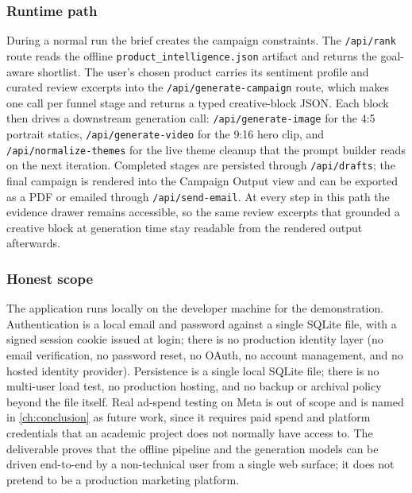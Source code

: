 \documentclass[12pt,a4paper]{report}
\begin{document}
\subsubsection{Runtime path}
\label{sec:webruntime}

During a normal run the brief creates the campaign constraints. The \texttt{/api/rank} route reads the offline \texttt{product\_intelligence.json} artifact and returns the goal-aware shortlist. The user's chosen product carries its sentiment profile and curated review excerpts into the \texttt{/api/generate-campaign} route, which makes one call per funnel stage and returns a typed creative-block JSON. Each block then drives a downstream generation call: \texttt{/api/generate-image} for the 4:5 portrait statics, \texttt{/api/generate-video} for the 9:16 hero clip, and \texttt{/api/normalize-themes} for the live theme cleanup that the prompt builder reads on the next iteration. Completed stages are persisted through \texttt{/api/drafts}; the final campaign is rendered into the Campaign Output view and can be exported as a PDF or emailed through \texttt{/api/send-email}. At every step in this path the evidence drawer remains accessible, so the same review excerpts that grounded a creative block at generation time stay readable from the rendered output afterwards.

\subsubsection{Honest scope}
\label{sec:webscope}

The application runs locally on the developer machine for the demonstration. Authentication is a local email and password against a single SQLite file, with a signed session cookie issued at login; there is no production identity layer (no email verification, no password reset, no OAuth, no account management, and no hosted identity provider). Persistence is a single local SQLite file; there is no multi-user load test, no production hosting, and no backup or archival policy beyond the file itself. Real ad-spend testing on Meta is out of scope and is named in \cref{ch:conclusion} as future work, since it requires paid spend and platform credentials that an academic project does not normally have access to. The deliverable proves that the offline pipeline and the generation models can be driven end-to-end by a non-technical user from a single web surface; it does not pretend to be a production marketing platform.


\end{document}

